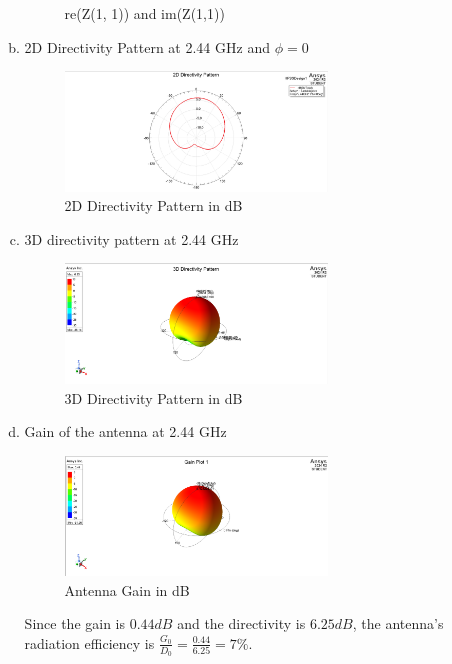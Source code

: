\documentclass{article} %
\begin{document}
\begin{enumerate}[(1)]
\begin{enumerate}[(a)]
\begin{figure}[H]
                        \caption{re(Z(1, 1)) and im(Z(1,1))}
                    \end{figure}
              \item 2D Directivity Pattern at 2.44 GHz and $\phi = 0$
                    \begin{figure}[H]
                        \centering
                        \includegraphics[width=0.7\textwidth]{./image/figure3.png}
                        \caption{2D Directivity Pattern in dB}
                    \end{figure}
              \item 3D directivity pattern at 2.44 GHz
                    \begin{figure}[H]
                        \centering
                        \includegraphics[width=0.7\textwidth]{./image/figure4.png}
                        \caption{3D Directivity Pattern in dB}
                    \end{figure}
              \item Gain of the antenna at 2.44 GHz
                    \begin{figure}[H]
                        \centering
                        \includegraphics[width=0.7\textwidth]{./image/figure5.png}
                        \caption{Antenna Gain in dB}
                    \end{figure}

                    Since the gain is $0.44 \si{dB}$ and the directivity is $6.25 \si{dB}$, the antenna's radiation efficiency is $\frac{G_0}{D_0} = \frac{0.44}{6.25} = \boxed{7 \%}$.
          \end{enumerate}

\end{enumerate}
\end{document}
